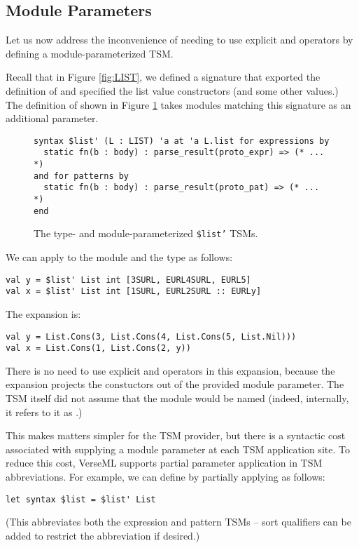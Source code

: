 \subsection{Module Parameters}\label{sec:module-parameters}
Let us now address the inconvenience of needing to use explicit  and   operators by  defining a module-parameterized TSM.

Recall that in Figure \ref{fig:LIST}, we defined a signature  that exported the definition of  and specified the list value constructors (and some other values.) The definition of  shown in Figure \ref{fig:ptsm-listprime} takes modules matching this signature as an additional parameter.

\begin{figure}[h]
\begin{lstlisting}[numbers=none]
syntax $list' (L : LIST) 'a at 'a L.list for expressions by 
  static fn(b : body) : parse_result(proto_expr) => (* ... *)
and for patterns by 
  static fn(b : body) : parse_result(proto_pat) => (* ... *)
end
\end{lstlisting}
\caption{The type- and module-parameterized \texttt{\$list'} TSMs.}
\label{fig:ptsm-listprime}
\end{figure}

We can apply  to the module  and the type  as follows:
\begin{lstlisting}[numbers=none]
val y = $list' List int [3SURL, EURL4SURL, EURL5]
val x = $list' List int [1SURL, EURL2SURL :: EURLy]
\end{lstlisting}
The expansion is:
\begin{lstlisting}[numbers=none]
val y = List.Cons(3, List.Cons(4, List.Cons(5, List.Nil)))
val x = List.Cons(1, List.Cons(2, y))
\end{lstlisting}
There is no need to use explicit  and  operators in this expansion, because the expansion projects the constuctors out of the provided module parameter. The TSM itself did not assume that the module would be named  (indeed, internally, it refers to it as .)

This makes matters simpler for the TSM provider, but there is a syntactic cost associated with supplying a module parameter at each TSM application site. To reduce this cost, VerseML supports partial parameter application in TSM abbreviations. For example, we can define  by partially applying  as follows:
\begin{lstlisting}[numbers=none]
let syntax $list = $list' List
\end{lstlisting}
(This abbreviates both the expression and pattern TSMs -- sort qualifiers can be added to restrict the abbreviation if desired.)



